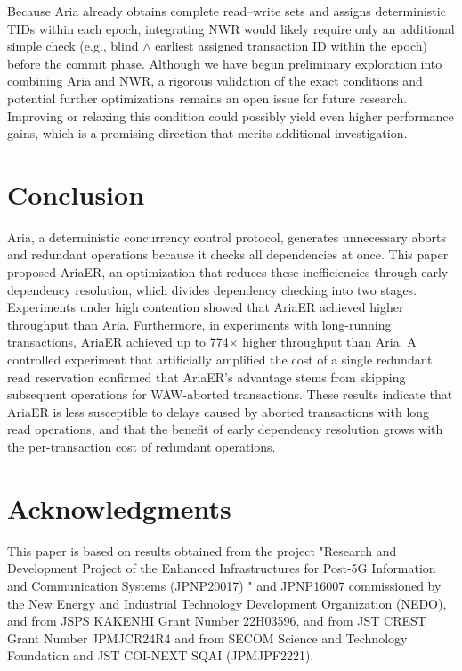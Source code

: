 \documentclass[english,preprint,JIP]{ipsj}
\begin{document}
Because Aria already obtains complete read–write sets and assigns deterministic TIDs within each epoch, integrating NWR would likely require only an additional simple check (e.g., blind $\land$ earliest assigned transaction ID within the epoch) before the commit phase.
Although we have begun preliminary exploration into combining Aria and NWR, a rigorous validation of the exact conditions and potential further optimizations remains an open issue for future research. Improving or relaxing this condition could possibly yield even higher performance gains, which is a promising direction that merits additional investigation.



\section{Conclusion}
Aria, a deterministic concurrency control protocol, generates unnecessary aborts and redundant operations because it checks all dependencies at once. This paper proposed AriaER, an optimization that reduces these inefficiencies through early dependency resolution, which divides dependency checking into two stages. Experiments under high contention showed that AriaER achieved higher throughput than Aria. Furthermore, in experiments with long-running transactions, AriaER achieved up to 774$\times$ higher throughput than Aria. A controlled experiment that artificially amplified the cost of a single redundant read reservation confirmed that AriaER's advantage stems from skipping subsequent operations for WAW-aborted transactions. These results indicate that AriaER is less susceptible to delays caused by aborted transactions with long read operations, and that the benefit of early dependency resolution grows with the per-transaction cost of redundant operations.

\section*{Acknowledgments}
This paper is based on results obtained from the project "Research and Development Project of the
Enhanced Infrastructures for Post-5G Information and Communication Systems (JPNP20017) " and
JPNP16007 commissioned by the New Energy and Industrial Technology Development Organization
(NEDO), and from JSPS KAKENHI Grant Number 22H03596, and from JST CREST Grant Number JPMJCR24R4 and from SECOM Science and Technology Foundation and JST COI-NEXT SQAI (JPMJPF2221).

\def\newblock{\hskip .11em plus .33em minus .07em}


\end{document}
